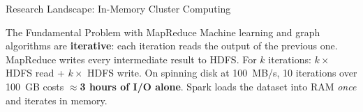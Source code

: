 \documentclass[aspectratio=169,10pt]{beamer}
\begin{document}
\begin{frame}{Research Landscape: In-Memory Cluster Computing}
\begin{center}
  \end{center}
  \vspace{4pt}
  \begin{alertblock}{The Fundamental Problem with MapReduce}
    Machine learning and graph algorithms are \textbf{iterative}: each
    iteration reads the output of the previous one.
    MapReduce writes every intermediate result to HDFS.
    For $k$ iterations: $k \times$ HDFS read + $k \times$ HDFS write.
    On spinning disk at 100~MB/s, 10 iterations over 100~GB costs
    \textbf{$\approx$3 hours of I/O alone}.
    Spark loads the dataset into RAM \emph{once} and iterates in memory.
  \end{alertblock}
\end{frame}
\end{document}

